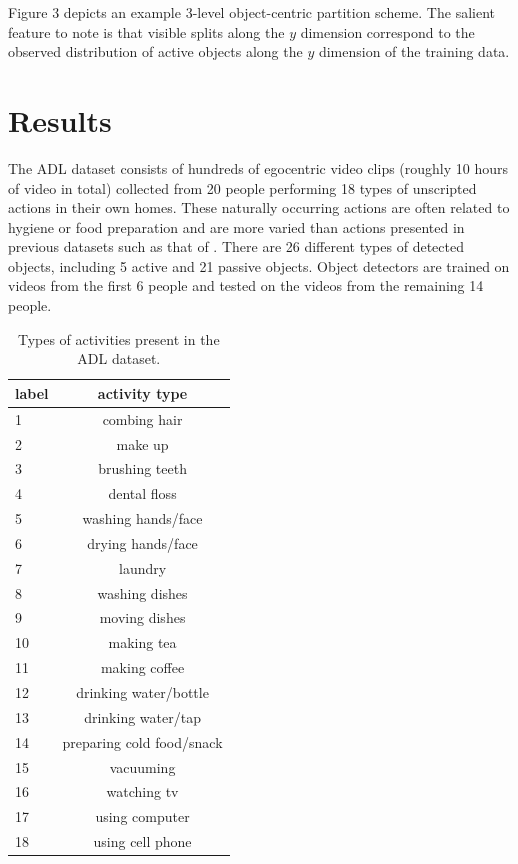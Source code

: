 \documentclass{bmvc2k}
\begin{document}
  Figure 3 depicts an example 3-level object-centric partition scheme. 
  The salient feature to note is that visible splits along the $y$
  dimension correspond to the observed distribution of active objects along
  the $y$ dimension of the training data.

\section{Results}
  The ADL dataset consists of hundreds of egocentric video clips
	(roughly 10 hours of video in total) collected from 20 people performing
	18 types of unscripted actions in their own homes. These naturally
  occurring
  actions are often related to hygiene or food preparation and are more
  varied than actions presented in previous datasets such as that of \cite{Fathi11}.
  There are 26 different 
	types of detected objects, including 5 active and 21 passive objects. 
  Object detectors are trained on videos from the
  first 6 people and tested on the videos from the remaining 14 people.
  
	\begin{table}
		\begin{center}
			\begin{tabular}{|l|c|}
				\hline \hline
        label & activity type \\
        \hline
        1 & combing hair \\
        \hline
        2 & make up \\
        \hline
        3 & brushing teeth \\
        \hline
        4 & dental floss \\
        \hline
        5 & washing hands/face \\
        \hline
        6 & drying hands/face \\
        \hline
        7 & laundry \\
        \hline
        8 & washing dishes \\
        \hline
        9 & moving dishes \\
        \hline
       10 & making tea \\
        \hline
       11 & making coffee \\
        \hline
       12 & drinking water/bottle \\
        \hline
       13 & drinking water/tap \\
        \hline
       14 & preparing cold food/snack \\
        \hline
       15 & vacuuming \\
        \hline
       16 & watching tv \\
        \hline
       17 & using computer \\
        \hline
       18 & using cell phone \\
				\hline
			\end{tabular}
		\end{center}
		\caption{Types of activities present in the ADL dataset.}
	\end{table}
  
\end{document}
